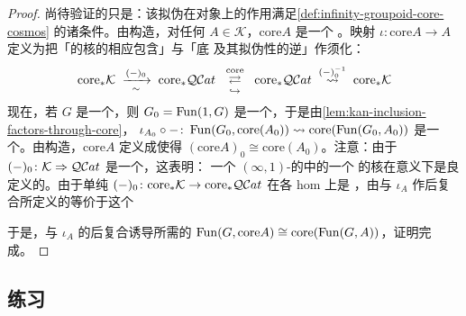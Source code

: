 \begin{proof}
尚待验证的只是：该拟伪\trFunctor{}在对象上的作用满足\cref{def:infinity-groupoid-core-cosmos}
的诸条件。由构造，对任何 $A\in\mathcal{K}$，$\mathrm{core}A$ 是一个%
\trDiscrete{}\trInfinityCategory。映射 $\iota\colon\mathrm{core}A\to A$
定义为把「\trQuasiCategory{}的\trKanComplex{}核的相应包含」与「底%
\trQuasiCategory{}\trFunctor{}及其拟伪\trFunctor{}性的逆」作须化：
\begin{equation*}
\coreS\mathcal{K}\;\xrightarrow[\ \sim\ ]{(-)_{0}}\;\coreS\QCat\;\;
\overset{\mathrm{core}}{\underset{\hookrightarrow}{\rightleftarrows}}\;\;
\coreS\QCat\;\overset{(-)_{0}^{-1}}{\rightsquigarrow}\;\coreS\mathcal{K}
\end{equation*}
现在，若 $G$ 是一个\trDiscrete{}\trInfinityCategory，则
$G_{0}=\operatorname{Fun}(1,G)$ 是一个\trKanComplex，于是由\cref{lem:kan-inclusion-factors-through-core}，
$\iota_{A_{0}}\circ-\colon\operatorname{Fun}(G_{0},\mathrm{core}(A_{0}))\rightsquigarrow\mathrm{core}(\operatorname{Fun}(G_{0},A_{0}))$
是一个\trEquivalence。由构造，$\mathrm{core}A$ 定义成使得
$(\mathrm{core}A)_{0}\cong\mathrm{core}(A_{0})$。注意：由于
$(-)_{0}\colon\mathcal{K}\Rightarrow\mathcal{Q}\mathcal{C}at$ 是一个\trBiequivalence，这表明：
一个 $(\infty,1)$-\trCategory{}的\trInfinityCosmos{}中的一个%
\trInfinityCategory{}的核在\trEquivalence{}意义下是良定义的。由于单纯%
\trFunctor{} $(-)_{0}\colon\mathrm{core}_{\ast}\mathcal{K}\to\mathrm{core}_{\ast}\mathcal{Q}\mathcal{C}at$ 在各 hom 上是%
\trEquivalence，由与 $\iota_{A}$ 作后复合所定义的\trFunctor{}等价于这个%
\trFunctor
\begin{center}
\end{center}
于是，与 $\iota_{A}$ 的后复合诱导所需的\trEquivalence{}
$\operatorname{Fun}(G,\mathrm{core}A)\cong\mathrm{core}(\operatorname{Fun}(G,A))$，证明完成。
\end{proof}

\subsection*{练习}

